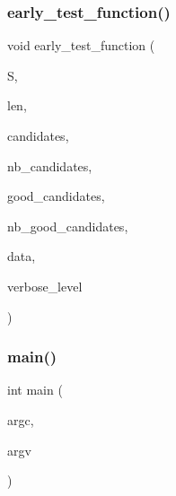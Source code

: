 \mbox{\label{hadamard_8_c_a31cd862d97914e4206b42d1c9a898353}} 
\subsubsection{\texorpdfstring{early\+\_\+test\+\_\+function()}{early\_test\_function()}}
{\footnotesize\ttfamily void early\+\_\+test\+\_\+function (\begin{DoxyParamCaption}\item[{\mbox{\hyperlink{galois_8h_a09fddde158a3a20bd2dcadb609de11dc}{I\+NT}} $\ast$}]{S,  }\item[{\mbox{\hyperlink{galois_8h_a09fddde158a3a20bd2dcadb609de11dc}{I\+NT}}}]{len,  }\item[{\mbox{\hyperlink{galois_8h_a09fddde158a3a20bd2dcadb609de11dc}{I\+NT}} $\ast$}]{candidates,  }\item[{\mbox{\hyperlink{galois_8h_a09fddde158a3a20bd2dcadb609de11dc}{I\+NT}}}]{nb\+\_\+candidates,  }\item[{\mbox{\hyperlink{galois_8h_a09fddde158a3a20bd2dcadb609de11dc}{I\+NT}} $\ast$}]{good\+\_\+candidates,  }\item[{\mbox{\hyperlink{galois_8h_a09fddde158a3a20bd2dcadb609de11dc}{I\+NT}} \&}]{nb\+\_\+good\+\_\+candidates,  }\item[{void $\ast$}]{data,  }\item[{\mbox{\hyperlink{galois_8h_a09fddde158a3a20bd2dcadb609de11dc}{I\+NT}}}]{verbose\+\_\+level }\end{DoxyParamCaption})}

\mbox{\label{hadamard_8_c_a3c04138a5bfe5d72780bb7e82a18e627}} 
\subsubsection{\texorpdfstring{main()}{main()}}
{\footnotesize\ttfamily int main (\begin{DoxyParamCaption}\item[{int}]{argc,  }\item[{char $\ast$$\ast$}]{argv }\end{DoxyParamCaption})}



